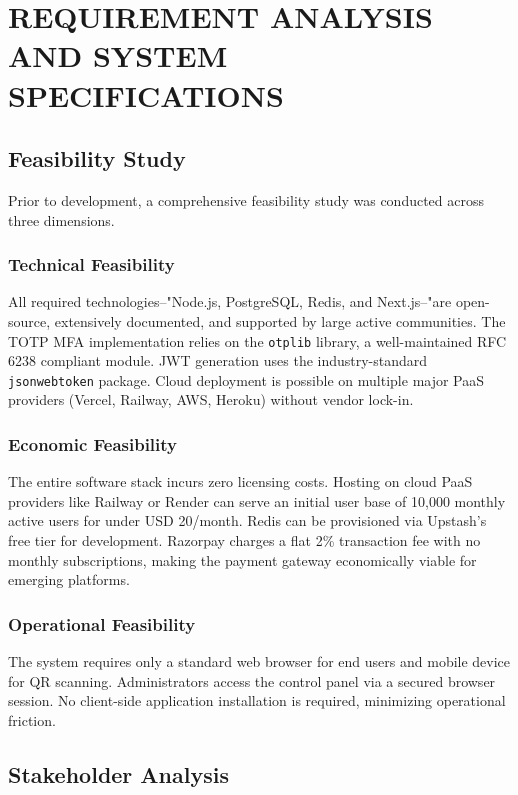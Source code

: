\documentclass[12pt,a4paper]{report}
\begin{document}
\chapter{REQUIREMENT ANALYSIS AND SYSTEM SPECIFICATIONS}

\section{Feasibility Study}
Prior to development, a comprehensive feasibility study was conducted across three dimensions.

\subsection{Technical Feasibility}
All required technologies--"Node.js, PostgreSQL, Redis, and Next.js--"are open-source, extensively documented, and supported by large active communities. The TOTP MFA implementation relies on the \texttt{otplib} library, a well-maintained RFC 6238 compliant module. JWT generation uses the industry-standard \texttt{jsonwebtoken} package. Cloud deployment is possible on multiple major PaaS providers (Vercel, Railway, AWS, Heroku) without vendor lock-in.

\subsection{Economic Feasibility}
The entire software stack incurs zero licensing costs. Hosting on cloud PaaS providers like Railway or Render can serve an initial user base of 10,000 monthly active users for under USD 20/month. Redis can be provisioned via Upstash's free tier for development. Razorpay charges a flat 2\% transaction fee with no monthly subscriptions, making the payment gateway economically viable for emerging platforms.

\subsection{Operational Feasibility}
The system requires only a standard web browser for end users and mobile device for QR scanning. Administrators access the control panel via a secured browser session. No client-side application installation is required, minimizing operational friction.

\section{Stakeholder Analysis}
\end{document}
